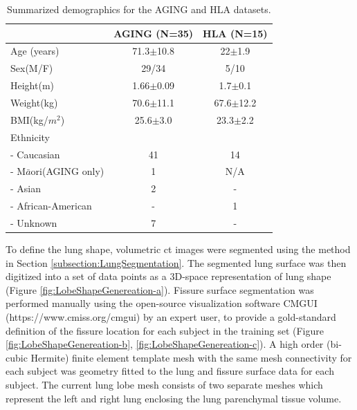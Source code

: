 \begin{table}[htbp]
\centering
\caption{Summarized demographics for the AGING and HLA datasets.}
\label{tab:SSMSubjects}
\begin{tabular}{l c c}
\hline
  & AGING (N=35) & HLA (N=15)\\ 
\hline
Age (years) & 71.3$ \pm $10.8 &  22$ \pm $1.9\\
Sex(M/F) & 29/34 & 5/10\\
Height(m) & 1.66$ \pm $0.09 &	1.7$ \pm $0.1\\
Weight(kg) & 70.6$ \pm $11.1 &	67.6$ \pm $12.2\\
BMI(kg/$m^{2}$) & 25.6$ \pm $3.0 &	23.3$ \pm $2.2\\
\hline
Ethnicity\\
- Caucasian & 41 &	14\\
- M$\bar{a}$ori(AGING only) & 1 &	N/A\\
- Asian & 2 &	-\\
- African-American & - &	1\\
 - Unknown & 7 &	-\\
\hline
\end{tabular}
\end{table}

To define the lung shape, volumetric \gls{ct} images were segmented using the method in Section \ref{subsection:LungSegmentation}. The segmented lung surface was then digitized into a set of data points as a 3D-space representation of lung shape (Figure \ref{fig:LobeShapeGenereation-a}). Fissure surface segmentation was performed manually using the open-source visualization software CMGUI (https://www.cmiss.org/cmgui) by an expert user, to provide a gold-standard definition of the fissure location for each subject in the training set (Figure \ref{fig:LobeShapeGenereation-b}, \ref{fig:LobeShapeGenereation-c}). A high order (bi-cubic Hermite) finite element template mesh with the same mesh connectivity for each subject was geometry fitted to the lung and fissure surface data for each subject. The current lung lobe mesh consists of two separate meshes which represent the left and right lung enclosing the lung parenchymal tissue volume. 

